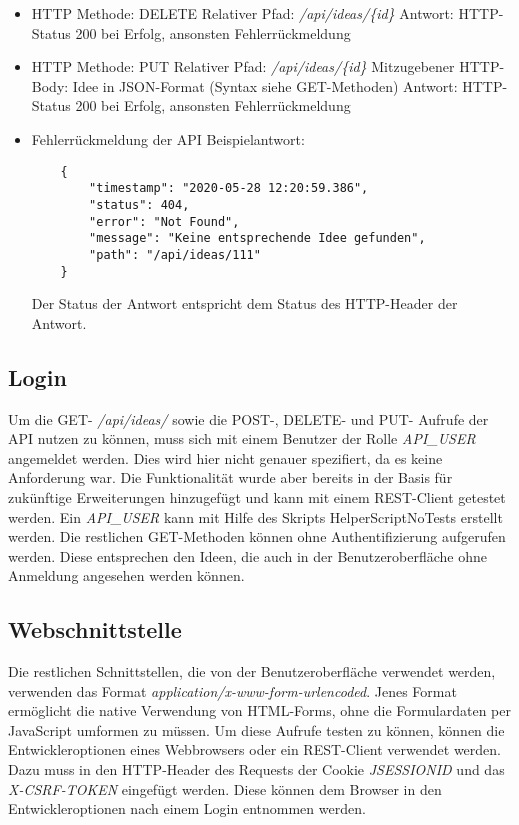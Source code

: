 \begin{itemize}
    \item HTTP Methode: DELETE
    \subitem Relativer Pfad: \textit{/api/ideas/\{id\}}
    \subitem Antwort: HTTP-Status 200 bei Erfolg, ansonsten Fehlerrückmeldung
\end{itemize}

\begin{itemize}
    \item HTTP Methode: PUT
    \subitem Relativer Pfad: \textit{/api/ideas/\{id\}}
    \subitem Mitzugebener HTTP-Body: Idee in JSON-Format (Syntax siehe GET-Methoden)
    \subitem Antwort: HTTP-Status 200 bei Erfolg, ansonsten Fehlerrückmeldung
\end{itemize}

\begin{itemize}
    \item Fehlerrückmeldung der API
    \subitem Beispielantwort:
    \begin{verbatim}
    {
        "timestamp": "2020-05-28 12:20:59.386",
        "status": 404,
        "error": "Not Found",
        "message": "Keine entsprechende Idee gefunden",
        "path": "/api/ideas/111"
    }
    \end{verbatim}
    \subitem Der Status der Antwort entspricht dem Status des HTTP-Header der Antwort.
\end{itemize}

\subsection{Login}
Um die GET- \textit{/api/ideas/} sowie die POST-, DELETE- und PUT- Aufrufe der API nutzen zu können, muss sich mit einem Benutzer der Rolle \textit{API\_USER} angemeldet werden.
Dies wird hier nicht genauer spezifiert, da es keine Anforderung war.
Die Funktionalität wurde aber bereits in der Basis für zukünftige Erweiterungen hinzugefügt und kann mit einem REST-Client getestet werden.
Ein \textit{API\_USER} kann mit Hilfe des Skripts HelperScriptNoTests erstellt werden.
Die restlichen GET-Methoden können ohne Authentifizierung aufgerufen werden. Diese entsprechen den Ideen, die auch in der Benutzeroberfläche ohne Anmeldung angesehen werden können.

\subsection{Webschnittstelle}
Die restlichen Schnittstellen, die von der Benutzeroberfläche verwendet werden, verwenden das Format \textit{application/x-www-form-urlencoded}.
Jenes Format ermöglicht die native Verwendung von HTML-Forms, ohne die Formulardaten per JavaScript umformen zu müssen.
Um diese Aufrufe testen zu können, können die Entwickleroptionen eines Webbrowsers oder ein REST-Client verwendet werden.
Dazu muss in den HTTP-Header des Requests der Cookie \textit{JSESSIONID} und das \textit{X-CSRF-TOKEN} eingefügt werden.
Diese können dem Browser in den Entwickleroptionen nach einem Login entnommen werden.
